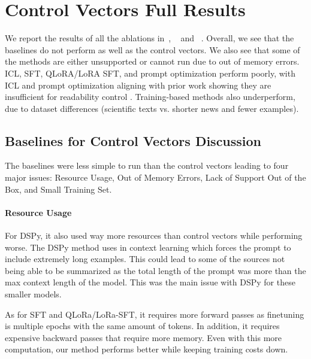 
\section{Control Vectors Full Results}\label{appendix:ch-4-full-results}
We report the results of all the ablations in~, ~ and ~. Overall, we see that the baselines do not perform as well as the control vectors. We also see that some of the methods are either unsupported or cannot run due to out of memory errors. ICL, SFT, QLoRA/LoRA SFT, and prompt optimization perform poorly, with ICL and prompt optimization aligning with prior work showing they are insufficient for readability control \cite{ribeiro-etal-2023-generating}. Training-based methods also underperform, due to dataset differences (scientific texts vs. shorter news and fewer examples). 


\subsection{Baselines for Control Vectors Discussion}\label{appendix:chap-4-baseline-discussion}
The baselines were less simple to run than the control vectors leading to four major issues: Resource Usage, Out of Memory Errors, Lack of Support Out of the Box, and Small Training Set. 
\paragraph{Resource Usage}
For DSPy, it also used way more resources than control vectors while performing worse. The DSPy method uses in context learning which forces the prompt to include extremely long examples. This could lead to some of the sources not being able to be summarized as the total length of the prompt was more than the max context length of the model. This was the main issue with DSPy for these smaller models. 

As for SFT and QLoRa/LoRa-SFT, it requires more forward passes as finetuning is multiple epochs with the same amount of tokens. In addition, it requires expensive backward passes that require more memory. Even with this more computation, our method performs better while keeping training costs down. 
